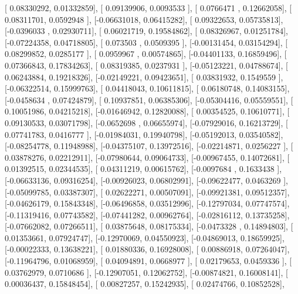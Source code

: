 \documentclass{article}
\begin{document}
       [ 0.08330292,  0.01332859],
       [ 0.09139906,  0.0093533 ],
       [ 0.0766471 ,  0.12662058],
       [ 0.08311701,  0.0592948 ],
       [-0.06631018,  0.06415282],
       [ 0.09322653,  0.05735813],
       [-0.0396033 ,  0.02930711],
       [ 0.06021719,  0.19584862],
       [ 0.08326967,  0.01251784],
       [-0.07224358,  0.04718805],
       [ 0.073503  ,  0.0509395 ],
       [-0.00131454,  0.03154294],
       [ 0.08299852,  0.0285177 ],
       [ 0.0959967 ,  0.00574865],
       [-0.04401133,  0.16859496],
       [ 0.07366843,  0.17834263],
       [ 0.08319385,  0.0237931 ],
       [-0.05123221,  0.04788674],
       [ 0.06243884,  0.19218326],
       [-0.02149221,  0.09423651],
       [ 0.03831932,  0.1549559 ],
       [-0.06322514,  0.15999763],
       [ 0.04418043,  0.10611815],
       [ 0.06180748,  0.14083155],
       [-0.0458634 ,  0.07424879],
       [ 0.10937851,  0.06385306],
       [-0.05304416,  0.05559551],
       [ 0.10051986,  0.04215218],
       [-0.01646942,  0.12820088],
       [ 0.00354525,  0.10610771],
       [ 0.09130533,  0.03071798],
       [-0.0652698 ,  0.06655974],
       [-0.07929016,  0.16213729],
       [ 0.07741783,  0.0416777 ],
       [-0.01984031,  0.19940798],
       [-0.05192013,  0.03540582],
       [-0.08254778,  0.11948988],
       [-0.04375107,  0.13972516],
       [-0.02214871,  0.0256227 ],
       [ 0.03878276,  0.02212911],
       [-0.07980644,  0.09064733],
       [-0.00967455,  0.14072681],
       [ 0.01392515,  0.02344535],
       [ 0.04311219,  0.00615762],
       [-0.0097684 ,  0.1633438 ],
       [-0.06633136,  0.09316254],
       [-0.00926023,  0.06802991],
       [-0.09622477,  0.0463269 ],
       [-0.05099785,  0.03387307],
       [ 0.02622271,  0.00507091],
       [-0.09921381,  0.09512357],
       [-0.04626179,  0.15843348],
       [-0.06496858,  0.03512996],
       [-0.12797034,  0.07747574],
       [-0.11319416,  0.07743582],
       [-0.07441282,  0.00962764],
       [-0.02816112,  0.13735258],
       [-0.07662082,  0.07266511],
       [ 0.03875648,  0.08175334],
       [-0.0473328 ,  0.14894803],
       [ 0.01353661,  0.07924747],
       [-0.12970069,  0.04550923],
       [-0.04869013,  0.18659925],
       [-0.00022333,  0.13638221],
       [ 0.01880336,  0.16928008],
       [ 0.00886918,  0.07264047],
       [-0.11964796,  0.01068959],
       [ 0.04094891,  0.0668977 ],
       [ 0.02179653,  0.0459336 ],
       [ 0.03762979,  0.0710686 ],
       [-0.12907051,  0.12062752],
       [-0.00874821,  0.16008141],
       [ 0.00036437,  0.15848454],
       [ 0.00827257,  0.15242935],
       [ 0.02474766,  0.10852528],
\end{document}
